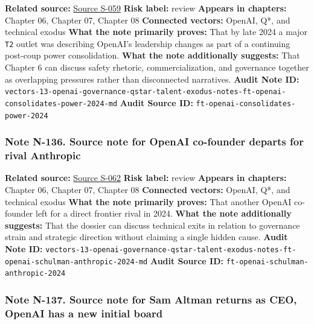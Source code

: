 \documentclass[
  american,
  11pt,
  letterpaper,
]{article}
\begin{document}
\textbf{Related source:}
\hyperref[source-s-059-who-s-left-at-openai-sam-altman-consolidates-power-after-failed-coup]{Source
S-059} \textbf{Risk label:} review \textbf{Appears in chapters:} Chapter
06, Chapter 07, Chapter 08 \textbf{Connected vectors:} OpenAI, Q*, and
technical exodus \textbf{What the note primarily proves:} That by late
2024 a major \texttt{T2} outlet was describing OpenAI's leadership
changes as part of a continuing post-coup power consolidation.
\textbf{What the note additionally suggests:} That Chapter 6 can discuss
safety rhetoric, commercialization, and governance together as
overlapping pressures rather than disconnected narratives. \textbf{Audit
Note ID:}
\texttt{vectors-13-openai-governance-qstar-talent-exodus-notes-ft-openai-consolidates-power-2024-md}
\textbf{Audit Source ID:} \texttt{ft-openai-consolidates-power-2024}

\subsubsection{Note N-136. Source note for OpenAI co-founder departs for
rival
Anthropic}\label{note-n-136-vectors-13-openai-governance-qstar-talent-exodus-notes-ft-openai-schulman-anthropic-2024-md}

\textbf{Related source:}
\hyperref[source-s-062-openai-co-founder-departs-for-rival-anthropic]{Source
S-062} \textbf{Risk label:} review \textbf{Appears in chapters:} Chapter
06, Chapter 07, Chapter 08 \textbf{Connected vectors:} OpenAI, Q*, and
technical exodus \textbf{What the note primarily proves:} That another
OpenAI co-founder left for a direct frontier rival in 2024. \textbf{What
the note additionally suggests:} That the dossier can discuss technical
exits in relation to governance strain and strategic direction without
claiming a single hidden cause. \textbf{Audit Note ID:}
\texttt{vectors-13-openai-governance-qstar-talent-exodus-notes-ft-openai-schulman-anthropic-2024-md}
\textbf{Audit Source ID:} \texttt{ft-openai-schulman-anthropic-2024}

\subsubsection{Note N-137. Source note for Sam Altman returns as CEO,
OpenAI has a new initial
board}\label{note-n-137-vectors-13-openai-governance-qstar-talent-exodus-notes-openai-altman-returns-board-2023-md}
\end{document}
